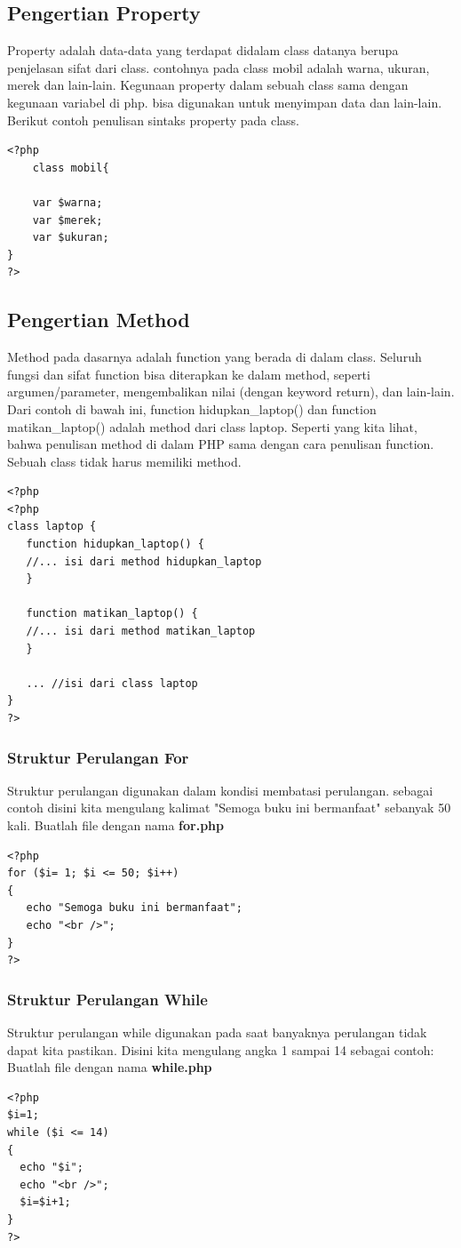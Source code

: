 \subsection{Pengertian Property}
Property adalah data-data yang terdapat didalam class datanya berupa penjelasan sifat dari class. contohnya pada class mobil adalah warna, ukuran, merek dan lain-lain. Kegunaan property dalam sebuah class sama dengan kegunaan variabel di php. bisa digunakan untuk menyimpan data dan lain-lain. Berikut contoh penulisan sintaks property pada class.
 \begin{lstlisting}
<?php
    class mobil{
	
	var $warna;
	var $merek;
	var $ukuran;
}
?>
\end{lstlisting}

\subsection{Pengertian Method}
Method pada dasarnya adalah function yang berada di dalam class. Seluruh fungsi dan sifat function bisa diterapkan ke dalam method, seperti argumen/parameter, mengembalikan nilai (dengan keyword return), dan lain-lain.
Dari contoh di bawah  ini, function hidupkan_laptop() dan function matikan_laptop() adalah method dari class laptop. Seperti yang kita lihat, bahwa penulisan method di dalam PHP sama dengan cara penulisan function. Sebuah class tidak harus memiliki method.
 \begin{lstlisting}
<?php
<?php
class laptop {
   function hidupkan_laptop() {
   //... isi dari method hidupkan_laptop
   }
 
   function matikan_laptop() {
   //... isi dari method matikan_laptop
   }
 
   ... //isi dari class laptop
}
?>
\end{lstlisting}

\subsubsection{Struktur Perulangan For}
Struktur perulangan digunakan dalam kondisi membatasi perulangan. sebagai contoh disini kita mengulang kalimat "Semoga buku ini bermanfaat" sebanyak 50 kali. Buatlah file dengan nama \textbf{for.php}
\begin{lstlisting}
<?php
for ($i= 1; $i <= 50; $i++)
{
   echo "Semoga buku ini bermanfaat";
   echo "<br />";
}
?>
\end{lstlisting}

\subsubsection{Struktur Perulangan While}
Struktur perulangan while digunakan pada saat banyaknya perulangan tidak dapat kita pastikan.
Disini kita mengulang angka  1 sampai 14 sebagai contoh:  Buatlah file dengan nama \textbf{while.php}
\begin{lstlisting}
<?php
$i=1;
while ($i <= 14)
{
  echo "$i";
  echo "<br />";
  $i=$i+1;
}
?>
\end{lstlisting}

